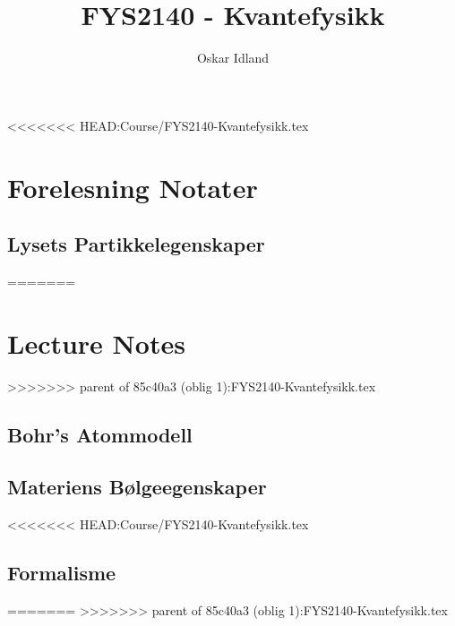 \documentclass[12pt]{report}
\author{Oskar Idland}
\title{FYS2140 - Kvantefysikk}
\date{}
\begin{document}
\maketitle
\newpage
\tableofcontents
\newpage



<<<<<<< HEAD:Course/FYS2140-Kvantefysikk.tex
\part{Forelesning Notater}

\chapter{Lysets Partikkelegenskaper}
=======
\part{Lecture Notes}
>>>>>>> parent of 85c40a3 (oblig 1):FYS2140-Kvantefysikk.tex



\chapter{Bohr's Atommodell}

\chapter{Materiens Bølgeegenskaper}





<<<<<<< HEAD:Course/FYS2140-Kvantefysikk.tex


% 
% 
% 
% 
\chapter{Formalisme}




=======
>>>>>>> parent of 85c40a3 (oblig 1):FYS2140-Kvantefysikk.tex
\end{document}
